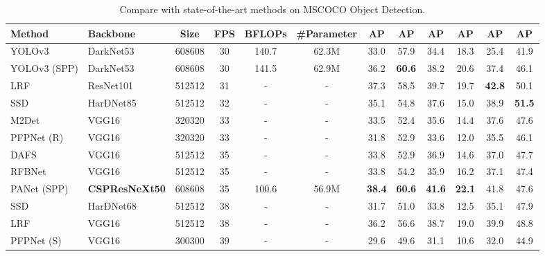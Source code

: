 \documentclass{article}
\begin{document}
\begin{table*}[t]
	\centering
	\begin{threeparttable}[t]
		\footnotesize
\caption{Compare with state-of-the-art methods on MSCOCO Object Detection.}
		\label{table:mscoco}
		\setlength\tabcolsep{3.5pt}
		\begin{tabular}{llcccccccccc}
			\toprule
			Method & Backbone & Size & FPS & BFLOPs & \#Parameter & AP & AP & AP & AP & AP & AP \\			
			\midrule	
			YOLOv3 \cite{redmon2018yolov3} & DarkNet53 \cite{redmon2018yolov3} & 608608 & 30 & 140.7 & 62.3M & 33.0 & 57.9 & 34.4 & 18.3 & 25.4 & 41.9 \\
			YOLOv3 (SPP) \cite{redmon2018yolov3} & DarkNet53 \cite{redmon2018yolov3} & 608608 & 30 & 141.5 & 62.9M & 36.2 & \textbf{60.6} & 38.2 & 20.6 & 37.4 & 46.1 \\	
			LRF \cite{wang2019learning} & ResNet101 \cite{he2016deep} & 512512 & 31 & - & - & 37.3 & 58.5 & 39.7 & 19.7 & \textbf{42.8} & 50.1 \\
			SSD \cite{liu2016ssd} & HarDNet85 \cite{chao2019hardnet} & 512512 & 32 & - & - & 35.1 & 54.8 & 37.6 & 15.0 & 38.9 & \textbf{51.5} \\	
			M2Det \cite{zhao2019m2det} & VGG16 \cite{simonyan2014very} & 320320 & 33 & - & - & 33.5 & 52.4 & 35.6 & 14.4 & 37.6 & 47.6 \\
			PFPNet (R) \cite{kim2018parallel} & VGG16 \cite{simonyan2014very} & 320320 & 33 & - & - & 31.8 & 52.9 & 33.6 & 12.0 & 35.5 & 46.1 \\	
			DAFS \cite{li2019dynamic} & VGG16 \cite{simonyan2014very} & 512512 & 35 & - & - & 33.8 & 52.9 & 36.9 & 14.6 & 37.0 & 47.7 \\
			RFBNet \cite{liu2018receptive} & VGG16 \cite{simonyan2014very} & 512512 & 35 & - & - & 33.8 & 54.2 & 35.9 & 16.2 & 37.1 & 47.4 \\
			PANet (SPP) \cite{liu2018path} & \textbf{CSPResNeXt50} &  608608 & 35 & 100.6 & 56.9M & \textbf{38.4} & \textbf{60.6} & \textbf{41.6} & \textbf{22.1} & 41.8 & 47.6 \\
			SSD \cite{liu2016ssd} & HarDNet68 \cite{chao2019hardnet} & 512512 & 38 & - & - & 31.7 & 51.0 & 33.8 & 12.5 & 35.1 & 47.9 \\	
			LRF \cite{wang2019learning} & VGG16 \cite{simonyan2014very} & 512512 & 38 & - & - & 36.2 & 56.6 & 38.7 & 19.0 & 39.9 & 48.8 \\
			PFPNet (S) \cite{kim2018parallel} & VGG16 \cite{simonyan2014very} & 300300 & 39 & - & - & 29.6 & 49.6 & 31.1 & 10.6 & 32.0 & 44.9 \\	

\end{tabular}
\end{threeparttable}
\end{table*}
\end{document}
